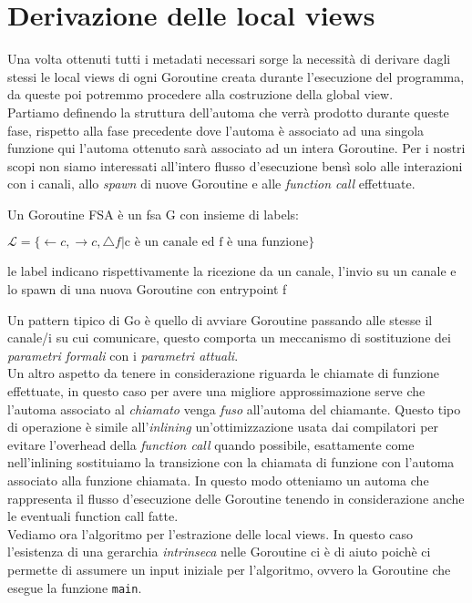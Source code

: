 \section{Derivazione delle local views}
Una volta ottenuti tutti i metadati necessari sorge la necessità di derivare dagli stessi le local views di ogni Goroutine creata durante l'esecuzione del programma, da queste poi potremmo procedere alla costruzione della global view.\bigskip\\
Partiamo definendo la struttura dell'automa che verrà prodotto durante queste fase, rispetto alla fase precedente dove l'automa è associato ad una singola funzione qui l'automa ottenuto sarà associato ad un intera Goroutine. Per i nostri scopi non siamo interessati all'intero flusso d'esecuzione bensì solo alle interazioni con i canali, allo \emph{spawn} di nuove Goroutine e alle \emph{function call} effettuate. \\
\begin{definition}
    Un Goroutine FSA è un fsa G con insieme di labels:
    \begin{center}
        $\mathcal{L} = \{ \leftarrow c, \rightarrow c, \bigtriangleup f | \text{c è un canale ed f è una funzione} \}$
    \end{center}
    le label indicano rispettivamente la ricezione da un canale, l'invio su un canale e lo spawn di una nuova Goroutine con entrypoint f
\end{definition}
Un pattern tipico di Go è quello di avviare Goroutine passando alle stesse il canale/i su cui comunicare, questo comporta un meccanismo di sostituzione dei \emph{parametri formali} con i \emph{parametri attuali}. \\
Un altro aspetto da tenere in considerazione riguarda le chiamate di funzione effettuate, in questo caso per avere una migliore approssimazione serve che l'automa associato al \emph{chiamato} venga \emph{fuso} all'automa del chiamante. Questo tipo di operazione è simile all'\emph{inlining} un'ottimizzazione usata dai compilatori per evitare l'overhead della \emph{function call} quando possibile, esattamente come nell'inlining sostituiamo la transizione con la chiamata di funzione con l'automa associato alla funzione chiamata. In questo modo otteniamo un automa che rappresenta il flusso d'esecuzione delle Goroutine tenendo in considerazione anche le eventuali function call fatte.\bigskip \\
Vediamo ora l'algoritmo per l'estrazione delle local views. In questo caso l'esistenza di una gerarchia \emph{intrinseca} nelle Goroutine ci è di aiuto poichè ci permette di assumere un input iniziale per l'algoritmo, ovvero la Goroutine che esegue la funzione \texttt{main}.
